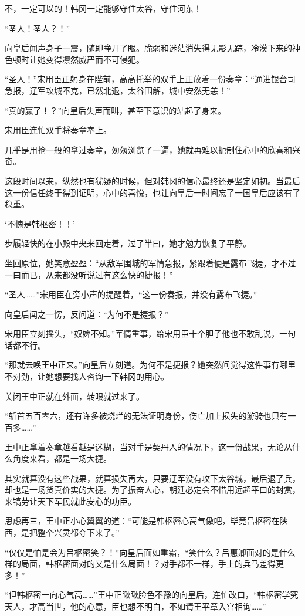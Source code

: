 不，一定可以的！韩冈一定能够守住太谷，守住河东！

“圣人！圣人？！”

向皇后闻声身子一震，随即睁开了眼。脆弱和迷茫消失得无影无踪，冷漠下来的神色顿时让她变得凛然威严而不可侵犯。

“圣人！”宋用臣正躬身在陛前，高高托举的双手上正放着一份奏章：“通进银台司急报，辽军攻城不克，已然北退，太谷围解，城中安然无恙！”

“真的赢了！？”向皇后失声而叫，甚至下意识的站起了身来。

宋用臣连忙双手将奏章奉上。

几乎是用抢一般的拿过奏章，匆匆浏览了一遍，她就再难以扼制住心中的欣喜和兴奋。

这段时间以来，纵然也有犹疑的时候，但对韩冈的信心最终还是坚定如初。当最后这一份信任终于得到证明，心中的喜悦，也让向皇后一时间忘了一国皇后应该有了稳重。

‘不愧是韩枢密！！’

步履轻快的在小殿中央来回走着，过了半曰，她才勉力恢复了平静。

坐回原位，她笑意盈盈：“从敌军围城的军情急报，紧跟着便是露布飞捷，才不过一曰而已，从来都没听说过有这么快的捷报！”

“圣人……”宋用臣在旁小声的提醒着，“这一份奏报，并没有露布飞捷。”

向皇后闻之一愣，反问道：“为何不是捷报？”

宋用臣立刻摇头，“奴婢不知。”军情重事，给宋用臣十个胆子他也不敢乱说，一句话都不行。

“那就去唤王中正来。”向皇后立刻道。为何不是捷报？她突然间觉得这件事有哪里不对劲，让她想要找人咨询一下韩冈的用心。

关闭王中正就在外面，转眼就过来了。

“斩首五百零六，还有许多被烧烂的无法证明身份，伤亡加上损失的游骑也只有一百多……”

王中正拿着奏章越看越是迷糊，当对手是契丹人的情况下，这一份战果，无论从什么角度来看，都是一场大捷。

其实就算没有这些战果，就算损失再大，只要辽军没有攻下太谷城，最后退了兵，却也是一场货真价实的大捷。为了振奋人心，朝廷必定会不惜用远超平曰的封赏，来犒劳让天下军民就此安心的功臣。

思虑再三，王中正小心翼翼的道：“可能是韩枢密心高气傲吧，毕竟吕枢密在陕西，是把整个兴灵都夺下来了。”

“仅仅是怕是会为吕枢密笑？！”向皇后面如重霜，“笑什么？吕惠卿面对的是什么样的局面，韩枢密面对的又是什么局面！？对手都不一样，手上的兵马差得更多！”

“但韩枢密一向心气高……”王中正瞅瞅脸色不豫的向皇后，连忙改口，“韩枢密学究天人，才高当世，他的心意，臣也想不明白，不如请王平章入宫相询……”

